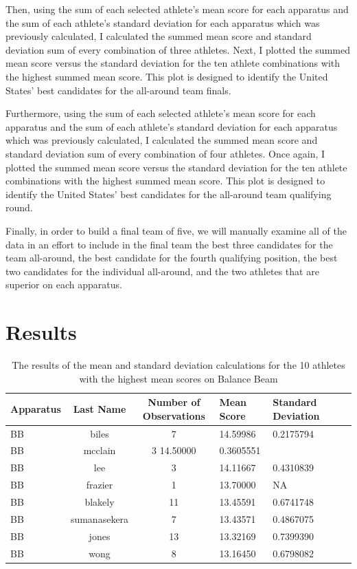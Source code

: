 \documentclass[12pt]{article}
\begin{document}
Then, using the sum of each selected athlete's mean score for each apparatus and the sum of each athlete's standard 
deviation for each apparatus which was previously calculated, I calculated the summed mean score and standard deviation sum 
of every combination of three athletes. Next, I plotted the summed mean score versus the standard deviation for the ten 
athlete combinations with the highest summed mean score. This plot is designed to identify the United States' best 
candidates for the all-around team finals.

Furthermore, using the sum of each selected athlete's mean score for each apparatus and the sum of each athlete's standard 
deviation for each apparatus which was previously calculated, I calculated the summed mean score and standard deviation sum 
of every combination of four athletes. Once again, I plotted the summed mean score versus the standard deviation for the ten 
athlete combinations with the highest summed mean score. This plot is designed to identify the United States' best 
candidates for the all-around team qualifying round.

Finally, in order to build a final team of five, we will manually examine all of the data in an effort to include in 
the final team the best three candidates for the team all-around, the best candidate for the fourth qualifying position, 
the best two candidates for the individual all-around, and the two athletes that are superior on each apparatus.


\section{Results}
\label{sec:res}

\begin{table}[tbp]
  \caption{The results of the mean and standard deviation calculations for the 10 athletes with the highest 
  mean scores on Balance Beam}
  \label{tab:tableBB}
\centering
\begin{tabular}[t]{lccllll}
  \toprule
  Apparatus & Last Name & Number of Observations & Mean Score & Standard Deviation\\
  \midrule
  BB & biles & 7 & 14.59986 & 0.2175794\\
  \midrule
  BB & mcclain & 3 14.50000 & 0.3605551\\
  \midrule
  BB & lee & 3 & 14.11667 & 0.4310839\\
  \midrule
  BB & frazier & 1 & 13.70000 & NA\\
  \midrule
  BB & blakely & 11 & 13.45591 & 0.6741748\\
  \midrule
  BB & sumanasekera & 7 & 13.43571 & 0.4867075\\
  \midrule
  BB & jones & 13 & 13.32169 & 0.7399390\\
  \midrule
  BB & wong & 8 & 13.16450 & 0.6798082\\
  \bottomrule
  \end{tabular}
  \end{table}
\end{document}
